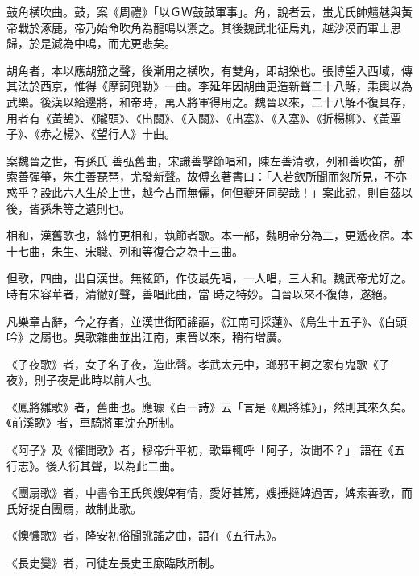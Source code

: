 \begin{pinyinscope}
 鼓角橫吹曲。鼓，案《周禮》「以ＧＷ鼓鼓軍事」。角，說者云，蚩尤氏帥魑魅與黃帝戰於涿鹿，帝乃始命吹角為龍鳴以禦之。其後魏武北征烏丸，越沙漠而軍士思歸，於是減為中鳴，而尤更悲矣。



 胡角者，本以應胡笳之聲，後漸用之橫吹，有雙角，即胡樂也。張博望入西域，傳其法於西京，惟得《摩訶兜勒》一曲。李延年因胡曲更造新聲二十八解，乘輿以為武樂。後漢以給邊將，和帝時，萬人將軍得用之。魏晉以來，二十八解不復具存，用者有《黃鵠》、《隴頭》、《出關》、《入關》、《出塞》、《入塞》、《折楊柳》、《黃覃子》、《赤之楊》、《望行人》十曲。



 案魏晉之世，有孫氏
 善弘舊曲，宋識善擊節唱和，陳左善清歌，列和善吹笛，郝索善彈箏，朱生善琵琶，尤發新聲。故傅玄著書曰：「人若欽所聞而忽所見，不亦惑乎？設此六人生於上世，越今古而無儷，何但夔牙同契哉！」案此說，則自茲以後，皆孫朱等之遺則也。



 相和，漢舊歌也，絲竹更相和，執節者歌。本一部，魏明帝分為二，更遞夜宿。本十七曲，朱生、宋職、列和等復合之為十三曲。



 但歌，四曲，出自漢世。無絃節，作伎最先唱，一人唱，三人和。魏武帝尤好之。時有宋容華者，清徹好聲，善唱此曲，當
 時之特妙。自晉以來不復傳，遂絕。



 凡樂章古辭，今之存者，並漢世街陌謠謳，《江南可採蓮》、《烏生十五子》、《白頭吟》之屬也。吳歌雜曲並出江南，東晉以來，稍有增廣。



 《子夜歌》者，女子名子夜，造此聲。孝武太元中，瑯邪王軻之家有鬼歌《子夜》，則子夜是此時以前人也。



 《鳳將雛歌》者，舊曲也。應璩《百一詩》云「言是《鳳將雛》」，然則其來久矣。《前溪歌》者，車騎將軍沈充所制。



 《阿子》及《懽聞歌》者，穆帝升平初，歌畢輒呼「阿子，汝聞不？」
 語在《五行志》。後人衍其聲，以為此二曲。



 《團扇歌》者，中書令王氏與嫂婢有情，愛好甚篤，嫂捶撻婢過苦，婢素善歌，而氏好捉白團扇，故制此歌。



 《懊憹歌》者，隆安初俗聞訛謠之曲，語在《五行志》。



 《長史變》者，司徒左長史王廞臨敗所制。




\end{pinyinscope}
